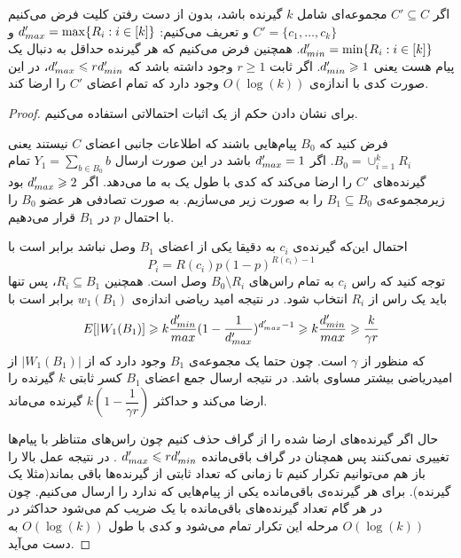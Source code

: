 \begin{lemma}
	\label{lemma:pliable2015:3}
	اگر
	$C' \subseteq C$
	مجموعه‌ای شامل 
	$k$
	گیرنده‌ باشد، بدون از دست رفتن کلیت فرض می‌کنیم
	$C' = \{c_1, \ldots, c_k\}$
	و تعریف می‌کنیم:
	$d_{max}' = \max\{R_i: i \in [k] \}$
	و
	$d_{min}' = \min\{R_i: i \in [k] \}$.
 همچنین فرض می‌کنیم که هر گیرنده حداقل به دنبال یک پیام هست یعنی
	$d_{min}' \geqslant 1$. 
 اگر ثابت
	$r \geq 1$
	وجود داشته باشد که
	$d_{max}' \leqslant r d_{min}'$،
	در این صورت کدی با اندازه‌ی
	$O(\log(k))$
	وجود دارد که تمام اعضای
	$C'$
	را ارضا کند.
\end{lemma}
\begin{proof}
	برای نشان دادن حکم از یک اثبات احتمالاتی استفاده می‌کنیم.
	
	فرض کنید که
	$B_0$
	پیام‌هایی باشند که اطلاعات جانبی اعضای
	$C$
	نیستند یعنی
	$B_0 = \cup_{i = 1}^{k} R_i$.
	اگر
	$d_{max}' = 1$
	باشد در این صورت ارسال
	$Y_1 = \sum_{b \in B_0} b$
	تمام گیرنده‌های
	$C'$
	را ارضا می‌کند که کدی با طول یک به ما می‌دهد. اگر
	$d_{max}' \geqslant 2$
	بود زیرمجموعه‌ی
	$B_1 \subseteq B_0$
	را به صورت زیر می‌سازیم. به صورت تصادفی هر عضو
	$B_0$
	را با احتمال
	$p$
	در 
	$B_1$
	قرار می‌دهیم.
	
	احتمال این‌که گیرنده‌ی
	$c_i$
	به دقیقا یکی از اعضای 
	$B_1$
	وصل نباشد برابر است با
	$$P_i = R(c_i) p (1 - p)^{R(c_i) - 1}$$
	توجه کنید که راس
	$c_i$
	به تمام راس‌های
	$B_0 \setminus R_i$
	وصل است. همچنین
	$R_i \subseteq B_1$،
	 پس تنها باید یک راس از
	$R_i$
	انتخاب شود. در نتیجه امید ریاضی اندازه‌ی
	$w_1(B_1)$
	برابر است با
	\begin{equation}
		E[|W_1(B_1)] \geqslant k \dfrac{d_{min}'}{max}(1 - \dfrac{1}{d_{max}'})^{d_{max}' - 1} \geqslant k \dfrac{d_{min}'}{max} \geqslant \dfrac{k}{\gamma r}
	\end{equation}
	که منظور از
	$\gamma$
	است. چون حتما یک مجموعه‌ی
	$B_1$
	وجود دارد که از 
	$|W_1(B_1)|$
	از امیدریاضی بیشتر مساوی باشد. در نتیجه ارسال جمع اعضای
	$B_1$
	کسر ثابتی
	$k$
	گیرنده‌ را ارضا می‌کند و حداکثر
	$k(1 - \dfrac{1}{\gamma r})$
	گیرنده می‌ماند.
	
	حال اگر گیرنده‌های ارضا شده را از گراف حذف کنیم چون راس‌های متناظر با پیام‌ها تغییری نمی‌کنند پس همچنان در گراف باقی‌مانده
	$d_{max}' \leqslant r d_{min}'$
	. در نتیجه عمل بالا را باز هم می‌توانیم تکرار کنیم تا زمانی که تعداد ثابتی از گیرنده‌ها باقی بماند(مثلا یک گیرنده). برای هر گیرنده‌ی باقی‌مانده یکی از پیام‌هایی که ندارد را ارسال می‌کنیم. چون در هر گام تعداد گیرنده‌های باقی‌مانده با یک ضریب کم می‌شود حداکثر در
	$O(\log(k))$
	مرحله این تکرار تمام می‌شود و کدی با طول
	$O(\log(k))$
	به دست می‌آید.
\end{proof}

